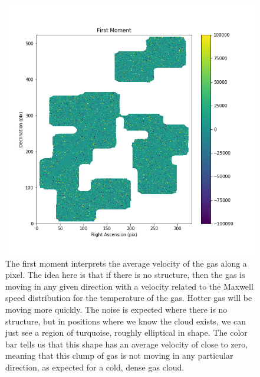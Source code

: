 \documentclass{article}
\begin{document}
\begin{figure}
    \centering
    \includegraphics[width=0.8\linewidth]{Photos/M_1.png}
    \caption{The first moment interprets the average velocity of the gas along a pixel. The idea here is that if there is no structure, then the gas is moving in any given direction with a velocity related to the Maxwell speed distribution for the temperature of the gas. Hotter gas will be moving more quickly. The noise is expected where there is no structure, but in positions where we know the cloud exists, we can just see a region of turquoise, roughly elliptical in shape. The color bar tells us that this shape has an average velocity of close to zero, meaning that this clump of gas is not moving in any particular direction, as expected for a cold, dense gas cloud.}
    \label{fig:M1}
\end{figure}
\end{document}

